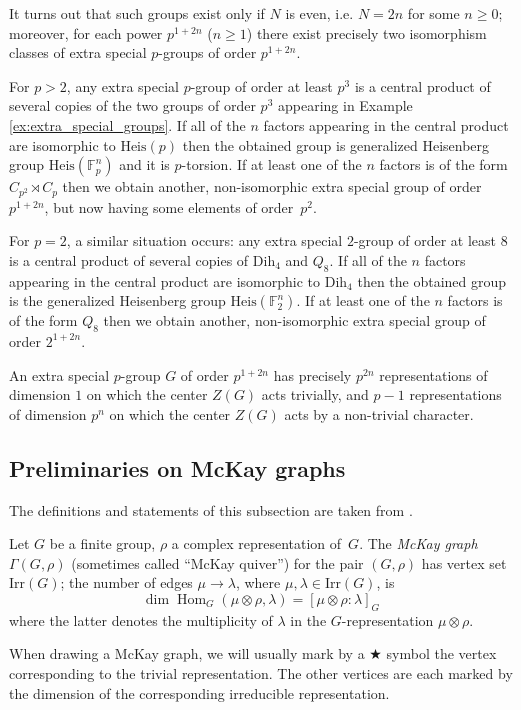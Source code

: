 \documentclass[ALCO]{cedram}
\newcommand{\Hom}{\operatorname{Hom}}
\newcommand{\F}{{\mathbb F}}
\newcommand{\lam}{{\lambda}}
\newcommand{\Hom}{\operatorname{Hom}}
\begin{document}
It turns out that such groups exist only if $N$ is even, i.e. $N=2n$ for some 
$n\geq 0$; moreover, for each power $p^{1+2n}$ ($n\geq 1$) there exist precisely 
two isomorphism classes of extra special $p$-groups of order $p^{1+2n}$. 

For $p>2$, any extra special $p$-group of order at least $p^3$ is a central 
product of several copies of the two groups of order $p^3$ appearing in Example 
\ref{ex:extra_special_groups}. If all of the $n$ factors appearing in the 
central product are isomorphic to $\mathrm{Heis}(p)$ then the obtained group is 
generalized Heisenberg group $\mathrm{Heis}(\F_p^n)$ and it is $p$-torsion. If at least 
one of the $n$ factors is of the form $C_{p^2} \rtimes C_p$ then we obtain 
another, non-isomorphic extra special group of order $p^{1+2n}$, but now having 
some elements of order~$p^2$.

For $p=2$, a similar situation occurs: any extra special $2$-group of order at 
least $8$ is a central product of several copies of $\mathrm{Dih}_4$ and $Q_8$. If 
all of the $n$ factors appearing in the central product are isomorphic to 
$\mathrm{Dih}_4$ then the obtained group is the generalized Heisenberg group 
$\mathrm{Heis}(\F_2^n)$. If at least one of the $n$ factors is of the form $Q_8$ then we 
obtain another, non-isomorphic extra special group of order $2^{1+2n}$.

An extra special $p$-group $G$ of order $p^{1+2n}$ has precisely $p^{2n}$ 
representations of dimension $1$ on which the center $Z(G)$ acts trivially, and 
$p-1$ representations of dimension $p^n$ on which the center $Z(G)$ acts by a 
non-trivial character.

\subsection{Preliminaries on McKay graphs}
The definitions and statements of this subsection are taken from \cite{McKay}.
\begin{defi}
Let $G$ be a finite group, $\rho$ a complex representation of~$G$. The 
{\it McKay graph} $\Gamma(G, \rho)$ (sometimes called ``McKay quiver'') for the 
pair $(G, \rho)$ has vertex set $\mathrm{Irr}(G)$; the number of edges $\mu \to \lam$, 
where $\mu,\lam \in \mathrm{Irr}(G)$, is 
$$\dim \Hom_G(\mu \otimes \rho,\lam) = [\mu\otimes \rho:\lam]_G$$ where the 
latter denotes the multiplicity of $\lam$ in the $G$-representation $\mu\otimes 
\rho$.
\end{defi}
When drawing a McKay graph, we will usually mark by a $\bigstar$ symbol the vertex corresponding to the trivial representation. The other vertices are each marked by the dimension of the corresponding irreducible representation. 
\end{document}
